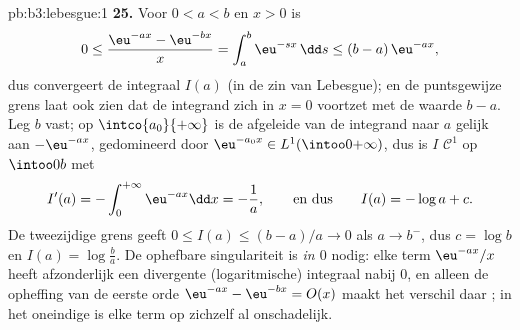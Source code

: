 \begin{solution}{pb:b3:lebesgue:1}
\textbf{25.} Voor $0 < a < b$ en $x > 0$ is
\[
0 \leq \frac{\eu^{-ax} - \eu^{-bx}}{x}
= \int_a^b \eu^{-sx}\,\dd s \leq (b - a)\,\eu^{-ax},
\]
dus convergeert de integraal $I(a)$ (in de zin van Lebesgue); en
de puntsgewijze grens laat ook zien dat de integrand zich in $x =
0$  voortzet met de waarde $b - a$. Leg $b$ vast; op
$\intco{a_0}{+\infty}$ is de afgeleide van de integrand naar $a$
gelijk aan $-\eu^{-ax}$, gedomineerd door $\eu^{-a_0x} \in
L^1(\intoo0{+\infty})$, dus is $I$ $\mathcal C^1$ op $\intoo0b$
met
\[
I'(a) = -\int_0^{+\infty}\eu^{-ax}\dd x = -\frac1a,
\qquad\text{en dus}\qquad
I(a) = -\log a + c .
\]
De tweezijdige grens geeft $0 \leq I(a) \leq (b-a)/a \to 0$ als $a
\to b^-$, dus $c = \log b$ en $I(a) = \log\frac ba$. De ophefbare
singulariteit is \emph{in $0$} nodig: elke term $\eu^{-ax}/x$
heeft afzonderlijk een divergente (logaritmische) integraal nabij
$0$, en alleen de opheffing van de eerste orde $\eu^{-ax} -
\eu^{-bx} = O(x)$ maakt het verschil daar ; in het
oneindige is elke term op zichzelf al onschadelijk.
\end{solution}

